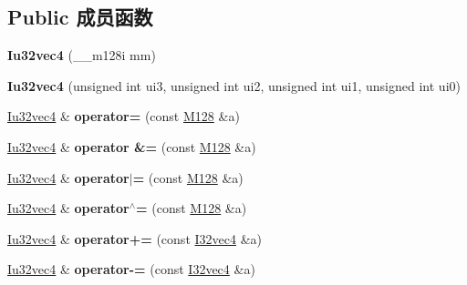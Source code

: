 \subsection*{Public 成员函数}
\begin{DoxyCompactItemize}
\item 
\mbox{\label{class_iu32vec4_ae48015e156734e76beb5db76eecc76f0}} 
{\bfseries Iu32vec4} (\+\_\+\+\_\+m128i mm)
\item 
\mbox{\label{class_iu32vec4_a2ebff55201ca063af64181357f957b10}} 
{\bfseries Iu32vec4} (unsigned int ui3, unsigned int ui2, unsigned int ui1, unsigned int ui0)
\item 
\mbox{\label{class_iu32vec4_adaa4b84c0c4719265d306584fa96a9bf}} 
\hyperlink{class_iu32vec4}{Iu32vec4} \& {\bfseries operator=} (const \hyperlink{class_m128}{M128} \&a)
\item 
\mbox{\label{class_iu32vec4_a8539573af51383c2f9cb9fc443202c40}} 
\hyperlink{class_iu32vec4}{Iu32vec4} \& {\bfseries operator \&=} (const \hyperlink{class_m128}{M128} \&a)
\item 
\mbox{\label{class_iu32vec4_a18313b9630efa29cc2ba574c2b4d45dd}} 
\hyperlink{class_iu32vec4}{Iu32vec4} \& {\bfseries operator$\vert$=} (const \hyperlink{class_m128}{M128} \&a)
\item 
\mbox{\label{class_iu32vec4_ae9d92fa3ca91d8df9d9acbafed94df7b}} 
\hyperlink{class_iu32vec4}{Iu32vec4} \& {\bfseries operator$^\wedge$=} (const \hyperlink{class_m128}{M128} \&a)
\item 
\mbox{\label{class_iu32vec4_a6bd4527b86fca78d1fcdd18403c313dd}} 
\hyperlink{class_iu32vec4}{Iu32vec4} \& {\bfseries operator+=} (const \hyperlink{class_i32vec4}{I32vec4} \&a)
\item 
\mbox{\label{class_iu32vec4_ae2df870fd446a04483508f2c14cd8268}} 
\hyperlink{class_iu32vec4}{Iu32vec4} \& {\bfseries operator-\/=} (const \hyperlink{class_i32vec4}{I32vec4} \&a)
\item 
\mbox{\label{class_iu32vec4_a6ad8a1d8a9bdfd4b9f4a8e3557f9c4a2}} 

\end{DoxyCompactItemize}
